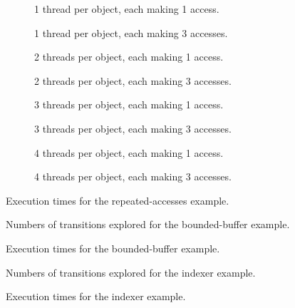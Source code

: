 \documentclass[12pt,a4paper,twoside,openright]{report}
\newenvironment{figtile} %
{\begin{subfigure}{0.48\textwidth}
		\def\svgwidth{\textwidth}
		\captionsetup{font=footnotesize}
	}
	{\end{subfigure}}
\begin{document}
\begin{figure}
	\centering
	\footnotesize
	\begin{figtile}
		
		\caption{1 thread per object,
			each making 1 access.}
	\end{figtile}%
	\quad
	\begin{figtile}
		
		\caption{1 thread per object,
			each making 3 accesses.}
	\end{figtile}
	\begin{figtile}
		
		\caption{2 threads per object,
			each making 1 access.}
	\end{figtile}%
	\quad
	\begin{figtile}
		
		\caption{2 threads per object,
			each making 3 accesses.}
	\end{figtile}
	\begin{figtile}
		
		\caption{3 threads per object,
			each making 1 access.}
	\end{figtile}%
	\quad
	\begin{figtile}
		
		\caption{3 threads per object,
			each making 3 accesses.}
	\end{figtile}
	\begin{figtile}
		
		\caption{4 threads per object,
			each making 1 access.}
	\end{figtile}%
	\quad
	\begin{figtile}
		
		\caption{4 threads per object,
			each making 3 accesses.}
		\label{fig:repeated-access-time-h}
	\end{figtile}
	\caption{Execution times for the repeated-accesses example.}
	\label{fig:repeated-access-time}
\end{figure}

\begin{figure}
	\centering

	\def\svgwidth{\textwidth}
	
	\caption{Numbers of transitions explored
		for the bounded-buffer example.}
	\label{fig:prod-cons-trans}
	\def\svgwidth{\textwidth}
	
	\caption{Execution times for the
		bounded-buffer example.}
	\label{fig:prod-cons-time}
\end{figure}

\begin{figure}
	\centering

	\def\svgwidth{\textwidth}
	
	\caption{Numbers of transitions explored
		for the indexer example.}
	\label{fig:indexer-trans}

	\def\svgwidth{\textwidth}
	
	\caption{Execution times
		for the indexer example.}
	\label{fig:indexer-time}
\end{figure}
\end{document}
